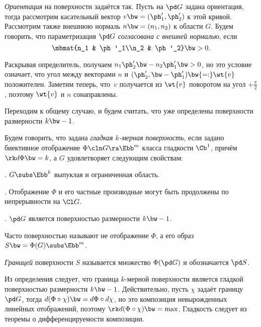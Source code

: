 \documentclass[a4paper]{article}
\begin{document}
\emph{Ориентация} на поверхности задаётся так. Пусть на $\pd G$ задана ориентация, тогда
рассмотрим касательный вектор $v \bw= (\ph'_1, \ph'_2)$ к этой кривой. Рассмотрим также
внешнюю нормаль $n \bw= (n_1, n_2)$ к области $G$. Будем говорить,
что параметризация $\pd G$ \emph{согласована с внешней нормалью}, если
\vskip-10pt
$$\mbmat{n_1 & \ph'_1\\n_2 & \ph'_2} \bw> 0.$$

\hangindent=-30mm
\noindent
Раскрывая определитель, получаем
$n_1\ph'_2 \bw- n_2\ph'_1 \bw> 0$, но это условие означает, что угол между векторами
$n$ и $(\ph'_2, \bw-\ph'_1) \bw{=:} \wt{v}$ положителен. Заметим теперь, что~$v$
получается из $\wt{v}$ поворотом на угол $+\frac\pi2$, поэтому $\wt{v}$ и $n$ сонаправлены.

Переходим к общему случаю, и будем считать, что уже определены поверхности размерности $k\bw-1$.

\begin{df}
Будем говорить, что задана \emph{гладкая $k$-мерная поверхность}, если задано биективное
отображение $\Phi\cln G \ra \Ebb^m$ класса гладкости $\Cb^1$, причём $\rk d\Phi \bw= k$, а
$G$ удовлетворяет следующим свойствам:

. $G \subs \Ebb^k$ выпуклая и ограниченная область.

. Отображение $\Phi$ и его частные производные могут быть продолжены по непрерывности на $\Cl G$.

. $\pd G$ является поверхностью размерности $k\bw-1$.

\end{df}

\begin{note}
Часто поверхностью называют не отображение $\Phi$, а его образ $S \bw= \Phi(G) \subs \Ebb^m$.
\end{note}

\begin{df}
\emph{Границей} поверхности $S$ называется множество $\Phi(\pd G)$ и обозначается $\pd S$.
\end{df}

Из определения следует, что граница $k$-мерной поверхности является гладкой поверхностью размерности $k\bw-1$.
Действительно, пусть $\chi$ задаёт границу $\pd G$, тогда $d(\Phi\circ\chi) \bw= d\Phi\circ d\chi$,
но это композиция невырожденных линейных отображений, поэтому $\rk d(\Phi\circ\chi) \bw= \max$.
Гладкость следует из теоремы о дифференцируемости композиции.
\end{document}
